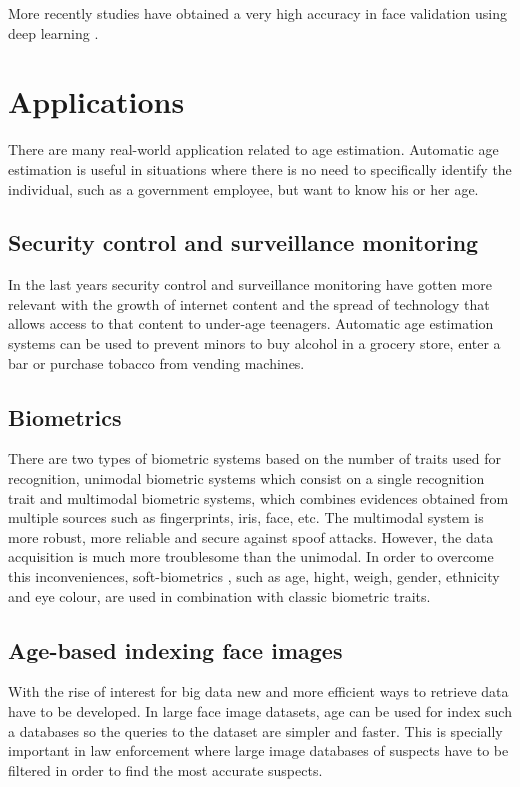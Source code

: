 More recently studies have obtained a very high accuracy in face validation using deep learning \cite{taigman2014deepface}.


\section{Applications}
There are many real-world application related to age estimation. Automatic age estimation is useful in situations where there is no need to specifically identify the individual, such as a government employee, but want to know his or her age.

\subsection{Security control and surveillance monitoring}
In the last years security control and surveillance monitoring have gotten more relevant with the growth of internet content and the spread of technology that allows access to that content to under-age teenagers. Automatic age estimation systems can be used to prevent minors to buy alcohol in a grocery store, enter a bar or purchase tobacco from vending machines.

\subsection{Biometrics}
There are two types of biometric systems based on the number of traits used for recognition, unimodal biometric systems which consist on a single recognition trait and multimodal biometric systems, which combines evidences obtained from multiple sources \cite{MSU-CSE-99-39} such as fingerprints, iris, face, etc. The multimodal system is more robust, more reliable and secure against spoof attacks. However, the data acquisition is much more troublesome than the unimodal. In order to overcome this inconveniences, soft-biometrics \cite{conf/icba/JainDN04}, such as age, hight, weigh, gender, ethnicity and eye colour, are used in combination with classic biometric traits. 

\subsection{Age-based indexing face images}
With the rise of interest for big data new and more efficient ways to retrieve data have to be developed. In large face image datasets, age can be used for index such a databases so the queries to the dataset are simpler and faster. This is specially important in law enforcement where large image databases of suspects have to be filtered in order to find the most accurate suspects.

